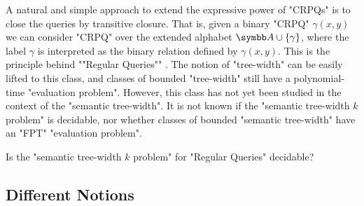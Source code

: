 A natural and simple approach to extend the expressive power of "CRPQs" is to close the queries by transitive closure. That is, given a binary "CRPQ" $\gamma(x,y)$ we can consider "CRPQ" over the extended alphabet $\A \cup \set \gamma$, where the label $\gamma$ is interpreted as the binary relation defined by $\gamma(x,y)$. \AP This is the principle behind ""Regular Queries"" \cite{ReutterRomeroVardi2017RegularQueries}. The notion of "tree-width" can be easily lifted to this class, and classes of bounded "tree-width" still have a polynomial-time "evaluation problem". However, this class has not yet been studied in the context of the "semantic tree-width". It is not known if the "semantic tree-width $k$ problem" is decidable, nor whether classes of bounded "semantic tree-width" have an "FPT" "evaluation problem".
\begin{question}
    Is the "semantic tree-width $k$ problem" for "Regular Queries" decidable?
\end{question}

\subsection{Different Notions}
\label{sec:discussion-stw-different-notions}

